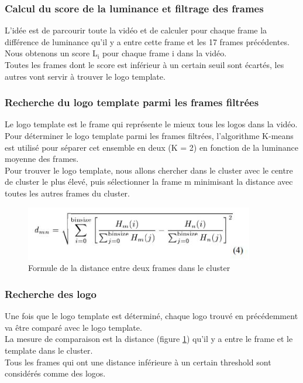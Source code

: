 \documentclass[11pt]{article}
\begin{document}
\subsubsection{Calcul du score de la luminance et filtrage des frames}
\label{sec:org36bf299}
L'idée est de parcourir toute la vidéo et de calculer pour chaque frame la différence de luminance qu'il y a entre cette frame et les 17 frames précédentes.\\
Nous obtenons un score L\(_{\text{i}}\) pour chaque frame i dans la vidéo.\\
Toutes les frames dont le score est inférieur à un certain seuil sont écartés, les autres vont servir à trouver le logo template.\\

\subsubsection{Recherche du logo template parmi les frames filtrées}
\label{sec:org56cbfe0}
Le logo template est le frame qui représente le mieux tous les logos dans la vidéo.\\
Pour déterminer le logo template parmi les frames filtrées, l'algorithme K-means est utilisé pour séparer cet ensemble en deux (K = 2) en fonction de la luminance moyenne des frames.\\
Pour trouver le logo template, nous allons chercher dans le cluster avec le centre de cluster le plus élevé, puis sélectionner la frame m minimisant la distance avec toutes les autres frames du cluster.\\

\begin{figure}[htbp]
\centering
\includegraphics[width=10cm]{robust_calc_dist.JPG}
\caption{Formule de la distance entre deux frames dans le cluster \label{calc-dist}}
\end{figure}


\subsubsection{Recherche des logo}
\label{sec:org85cccb4}
Une fois que le logo template est déterminé, chaque logo trouvé en précédemment va être comparé avec le logo template.\\
La mesure de comparaison est la distance (figure \ref{calc-dist}) qu'il y a entre le frame et le template dans le cluster.\\
Tous les frames qui ont une distance inférieure à un certain threshold sont considérés comme des logos.\\
\end{document}
